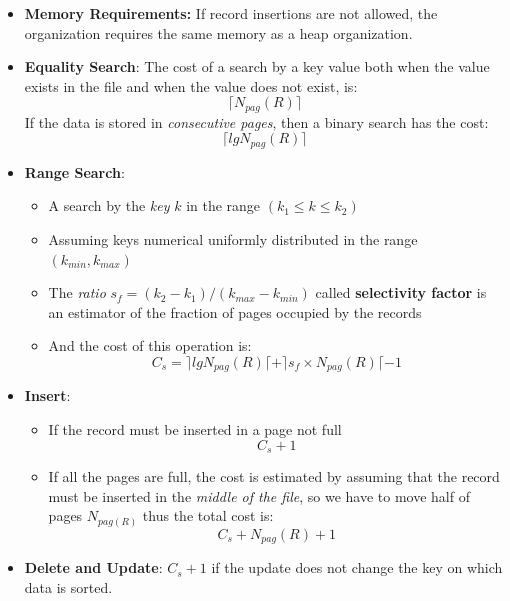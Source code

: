 \begin{itemize}
    \item \textbf{Memory Requirements:} If record insertions are not allowed, the organization requires the same memory as a heap organization.
    \item \textbf{Equality Search}: The cost of a search by a key value both when the value exists in the file and when the value does not exist, is:
    \[\lceil N_{pag}(R) \rceil\]
    If the data is stored in \textit{consecutive pages}, then a binary search has the cost:
    \[\lceil lg N_{pag}(R) \rceil\]
    
    \item \textbf{Range Search}:
    \begin{itemize}
        \item A search by the \textit{key} \(k\) in the range \((k_1 \leq k \leq k_2)\)
        \item Assuming keys numerical uniformly distributed in the range \((k_{min}, k_{max})\)
        \item The \textit{ratio} \(s_f = (k_2 - k_1) / (k_{max} - k_{min})\) called \textbf{selectivity factor} is an estimator of the fraction of pages occupied by the records
        \item And the cost of this operation is:
        \[C_s = \rceil lg N_{pag}(R) \lceil + \rceil s_f \times N_{pag}(R) \lceil - 1\]
    \end{itemize}
    
    \item \textbf{Insert}:
    \begin{itemize}
        \item If the record must be inserted in a page not full
        \[C_s + 1\]
        \item If all the pages are full, the cost is estimated by assuming that the record must be inserted in the \textit{middle of the file}, so we have to move half of pages \(N_{pag(R)}\) thus the total cost is:
        \[C_s + N_{pag}(R) + 1\]
    \end{itemize}
    \item \textbf{Delete and Update}: \(C_s + 1\) if the update does not change the key on which data is sorted.
\end{itemize}

